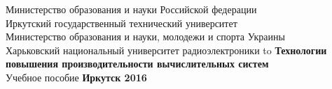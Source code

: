 \documentclass[14pt, a4paper, openany, twoside, final]{extbook} %
\begin{document}

\renewcommand{\chaptername}{} %
\renewcommand{\refname}{Рекомендуемая литература} %
\renewcommand{\bibname}{\refname}
\begin{titlepage}
\thispagestyle{empty}
\begin{center}{\small{}
Министерство образования и науки
Российской федерации \\
Иркутский государственный технический университет\\[1ex]
Министерство образования и науки, молодежи и спорта Украины\\
Харьковский национальный университет радиоэлектроники
}
\vfill
\hbox to \linewidth{\hfill\bfseries Е.~А.~Черкашин, В.~О.~Обризан\hfill}
 \vspace{2em}
{\large\bfseries Технологии повышения производительности вычислительных систем}\\
 \vspace{2em}
{Учебное пособие}
\vfill
\vfill
 \textbf{Иркутск 2016}
\end{center}
\end{titlepage}
\end{document}
